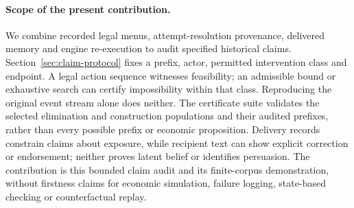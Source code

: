 \paragraph{Scope of the present contribution.}
We combine recorded legal menus, attempt-resolution provenance, delivered memory and engine re-execution to audit specified historical claims. Section~\ref{sec:claim-protocol} fixes a prefix, actor, permitted intervention class and endpoint. A legal action sequence witnesses feasibility; an admissible bound or exhaustive search can certify impossibility within that class. Reproducing the original event stream alone does neither. The certificate suite validates the selected elimination and construction populations and their audited prefixes, rather than every possible prefix or economic proposition. Delivery records constrain claims about exposure, while recipient text can show explicit correction or endorsement; neither proves latent belief or identifies persuasion. The contribution is this bounded claim audit and its finite-corpus demonstration, without firstness claims for economic simulation, failure logging, state-based checking or counterfactual replay.
